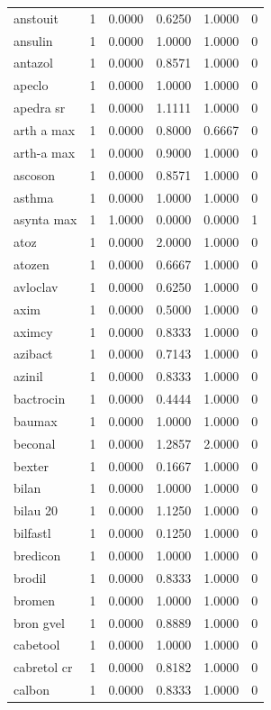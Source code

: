 \begin{longtable}{p{3.0cm}rrrrr}
anstouit & 1 & 0.0000 & 0.6250 & 1.0000 & 0 \\
ansulin & 1 & 0.0000 & 1.0000 & 1.0000 & 0 \\
antazol & 1 & 0.0000 & 0.8571 & 1.0000 & 0 \\
apeclo & 1 & 0.0000 & 1.0000 & 1.0000 & 0 \\
apedra sr & 1 & 0.0000 & 1.1111 & 1.0000 & 0 \\
arth a max & 1 & 0.0000 & 0.8000 & 0.6667 & 0 \\
arth-a max & 1 & 0.0000 & 0.9000 & 1.0000 & 0 \\
ascoson & 1 & 0.0000 & 0.8571 & 1.0000 & 0 \\
asthma & 1 & 0.0000 & 1.0000 & 1.0000 & 0 \\
asynta max & 1 & 1.0000 & 0.0000 & 0.0000 & 1 \\
atoz & 1 & 0.0000 & 2.0000 & 1.0000 & 0 \\
atozen & 1 & 0.0000 & 0.6667 & 1.0000 & 0 \\
avloclav & 1 & 0.0000 & 0.6250 & 1.0000 & 0 \\
axim & 1 & 0.0000 & 0.5000 & 1.0000 & 0 \\
aximcy & 1 & 0.0000 & 0.8333 & 1.0000 & 0 \\
azibact & 1 & 0.0000 & 0.7143 & 1.0000 & 0 \\
azinil & 1 & 0.0000 & 0.8333 & 1.0000 & 0 \\
bactrocin & 1 & 0.0000 & 0.4444 & 1.0000 & 0 \\
baumax & 1 & 0.0000 & 1.0000 & 1.0000 & 0 \\
beconal & 1 & 0.0000 & 1.2857 & 2.0000 & 0 \\
bexter & 1 & 0.0000 & 0.1667 & 1.0000 & 0 \\
bilan & 1 & 0.0000 & 1.0000 & 1.0000 & 0 \\
bilau 20 & 1 & 0.0000 & 1.1250 & 1.0000 & 0 \\
bilfastl & 1 & 0.0000 & 0.1250 & 1.0000 & 0 \\
bredicon & 1 & 0.0000 & 1.0000 & 1.0000 & 0 \\
brodil & 1 & 0.0000 & 0.8333 & 1.0000 & 0 \\
bromen & 1 & 0.0000 & 1.0000 & 1.0000 & 0 \\
bron gvel & 1 & 0.0000 & 0.8889 & 1.0000 & 0 \\
cabetool & 1 & 0.0000 & 1.0000 & 1.0000 & 0 \\
cabretol cr & 1 & 0.0000 & 0.8182 & 1.0000 & 0 \\
calbon & 1 & 0.0000 & 0.8333 & 1.0000 & 0 \\

\end{longtable}
